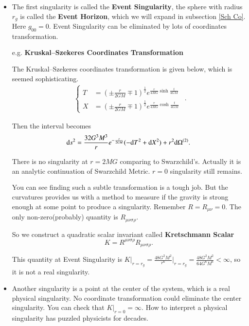 \documentclass[openany,10pt]{book}
\theoremstyle{definition}
\theoremstyle{definition}
\theoremstyle{remark}
\begin{document}
\begin{itemize}
    \item 
The first singularity is called the \textbf{Event Singularity}, the sphere with radius $r_g$ is called the \textbf{Event Horizon}, which we will  expand in subsection \ref{Sch Co}. Here $g_{00}=0$. Event Singularity can be eliminated by lots of coordinates transformation.

\hrulefill

e.g. \textbf{Kruskal--Szekeres Coordinates Transformation}

The Kruskal--Szekeres coordinates transformation is given below, which is seemed sophisticating.
\begin{equation}
\begin{aligned}\begin{cases}
    T&=(\pm\frac{r}{2GM}\mp 1)^{\frac{1}{2}}e^{\frac{r}{4MG}\sinh{\frac{t}{4GM}}}\\
    X&=(\pm\frac{r}{2GM}\mp 1)^{\frac{1}{2}}e^{\frac{r}{4MG}\cosh{\frac{t}{4GM}}}
\end{cases}
\end{aligned}.
\end{equation}

Then the interval becomes
\begin{equation}
      {\rm d}s^2=\frac{32G^3M^3}{r}e^{-\frac{r}{2GM}}(-{\rm d}T^2+ {\rm d}X^2)+r^2 {\rm d}\Omega^{(2)}.
\end{equation}

There is no singularity at $r=2MG$ comparing to Swarzchild's. Actually it is an analytic continuation of Swarzchild Metric. $r=0$ singularity still remains.

\hrulefill

You can see finding such a subtle transformation is a tough job. But the curvatures provides us with a method to measure if the gravity is strong enough at some point to produce a singularity. Remember $R=R_{\mu\nu}=0$. The only non-zero(probably) quantity is $R_{\mu\nu\sigma\rho}$.

So we construct a quadratic scalar invariant called {\bfseries Kretschmann Scalar} 
\begin{equation}
    K=R^{\mu\nu\sigma\rho}R_{\mu\nu\sigma\rho}.
\end{equation}

This quantity at Event Singularity is $K\Big|_{r=r_g}=\frac{48G^2M^2}{r^6}\Big|_{r=r_g}=\frac{48G^2M^2}{64G^6M^6}<\infty$, so it is not a real singularity. 

\item Another singularity is a point at the center of the system, which is a real physical singularity. No coordinate transformation could eliminate the center singularity. You can check that $K\Big|_{r=0}=\infty$. How to interpret a physical singularity has puzzled physicists for decades.
\end{itemize}
\end{document}
